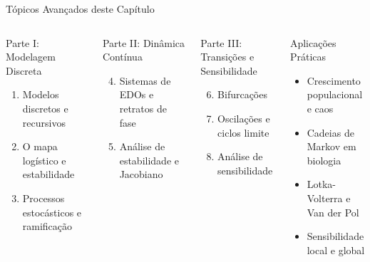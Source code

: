 \begin{frame}[allowframebreaks]{Tópicos Avançados deste Capítulo}
\begin{columns}
\begin{block}{Parte I: Modelagem Discreta}
\begin{enumerate}
    \item Modelos discretos e recursivos
    \item O mapa logístico e estabilidade
    \item Processos estocásticos e ramificação
\end{enumerate}
\end{block}

\begin{block}{Parte II: Dinâmica Contínua}
\begin{enumerate}
    \setcounter{enumi}{3}
    \item Sistemas de EDOs e retratos de fase
    \item Análise de estabilidade e Jacobiano
\end{enumerate}
\end{block}

\begin{block}{Parte III: Transições e Sensibilidade}
\begin{enumerate}
    \setcounter{enumi}{5}
    \item Bifurcações
    \item Oscilações e ciclos limite
    \item Análise de sensibilidade
\end{enumerate}
\end{block}

\begin{exampleblock}{Aplicações Práticas}
\begin{itemize}
    \item Crescimento populacional e caos
    \item Cadeias de Markov em biologia
    \item Lotka-Volterra e Van der Pol
    \item Sensibilidade local e global
\end{itemize}
\end{exampleblock}
\end{columns}
\end{frame}

